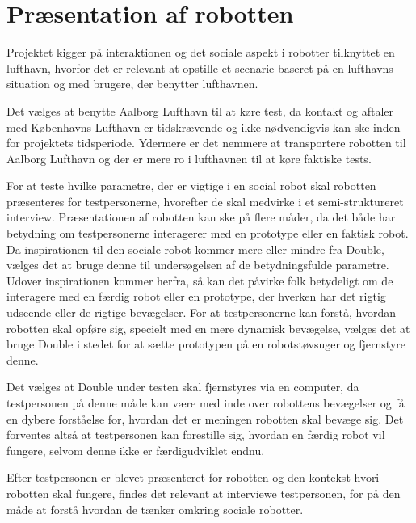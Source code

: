 \section{Præsentation af robotten}
%
Projektet kigger på interaktionen og det sociale aspekt i robotter tilknyttet en lufthavn, hvorfor det er relevant at opstille et scenarie baseret på en lufthavns situation og med brugere, der benytter lufthavnen.

Det vælges at benytte Aalborg Lufthavn til at køre test, da kontakt og aftaler med Københavns Lufthavn er tidskrævende og ikke nødvendigvis kan ske inden for projektets tidsperiode. Ydermere er det nemmere at transportere robotten til Aalborg Lufthavn og der er mere ro i lufthavnen til at køre faktiske tests.\blankline

For at teste hvilke parametre, der er vigtige i en social robot skal robotten præsenteres for testpersonerne, hvorefter de skal medvirke i et semi-struktureret interview. Præsentationen af robotten kan ske på flere måder, da det både har betydning om testpersonerne interagerer med en prototype eller en faktisk robot. Da inspirationen til den sociale robot kommer mere eller mindre fra Double, vælges det at bruge denne til undersøgelsen af de betydningsfulde parametre. Udover inspirationen kommer herfra, så kan det påvirke folk betydeligt om de interagere med en færdig robot eller en prototype, der hverken har det rigtig udseende eller de rigtige bevægelser. For at testpersonerne kan forstå, hvordan robotten skal opføre sig, specielt med en mere dynamisk bevægelse, vælges det at bruge Double i stedet for at sætte prototypen på en robotstøvsuger og fjernstyre denne. 

Det vælges at Double under testen skal fjernstyres via en computer, da testpersonen på denne måde kan være med inde over robottens bevægelser og få en dybere forståelse for, hvordan det er meningen robotten skal bevæge sig. Det forventes altså at testpersonen kan forestille sig, hvordan en færdig robot vil fungere, selvom denne ikke er færdigudviklet endnu.\blankline


Efter testpersonen er blevet præsenteret for robotten og den kontekst hvori robotten skal fungere, findes det relevant at interviewe testpersonen, for på den måde at forstå hvordan de tænker omkring sociale robotter.